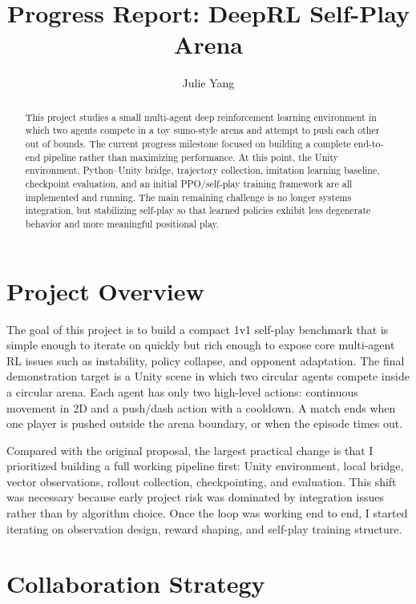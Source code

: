 \documentclass[10pt,twocolumn,letterpaper]{article}
\begin{document}
\title{Progress Report: DeepRL Self-Play Arena}

\author{
Julie Yang
}
\maketitle

\begin{abstract}
This project studies a small multi-agent deep reinforcement learning environment in which two agents compete in a toy sumo-style arena and attempt to push each other out of bounds. The current progress milestone focused on building a complete end-to-end pipeline rather than maximizing performance. At this point, the Unity environment, Python--Unity bridge, trajectory collection, imitation learning baseline, checkpoint evaluation, and an initial PPO/self-play training framework are all implemented and running. The main remaining challenge is no longer systems integration, but stabilizing self-play so that learned policies exhibit less degenerate behavior and more meaningful positional play.
\end{abstract}

\section{Project Overview}

The goal of this project is to build a compact 1v1 self-play benchmark that is simple enough to iterate on quickly but rich enough to expose core multi-agent RL issues such as instability, policy collapse, and opponent adaptation. The final demonstration target is a Unity scene in which two circular agents compete inside a circular arena. Each agent has only two high-level actions: continuous movement in 2D and a push/dash action with a cooldown. A match ends when one player is pushed outside the arena boundary, or when the episode times out.

Compared with the original proposal, the largest practical change is that I prioritized building a full working pipeline first: Unity environment, local bridge, vector observations, rollout collection, checkpointing, and evaluation. This shift was necessary because early project risk was dominated by integration issues rather than by algorithm choice. Once the loop was working end to end, I started iterating on observation design, reward shaping, and self-play training structure.

\section{Collaboration Strategy}
\end{document}
